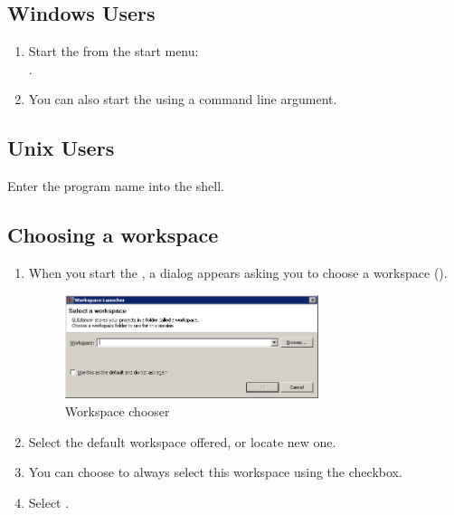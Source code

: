 

\subsection{Windows Users}
\begin{enumerate}
\item Start the \ite{}  from the start menu:\\
.

\item You can also start the \ite{} using a command line argument.
\end{enumerate}

\subsection{Unix Users}
Enter the program name into the shell. 


\subsection{Choosing a workspace}
\begin{enumerate}
\item When you start the \ite{}, a dialog appears asking you to choose a workspace ().

\begin{figure}[h]
\begin{center}
\includegraphics[width=0.7\textwidth]{Tasks/Start/PS/workspacechooser}
\caption{Workspace chooser}
\label{WorkspaceChooser}
\end{center}
\end{figure}

\item Select the default workspace offered, or locate new one. 
\item You can choose to always select this workspace using the checkbox.
 \item Select .
 \end{enumerate}

